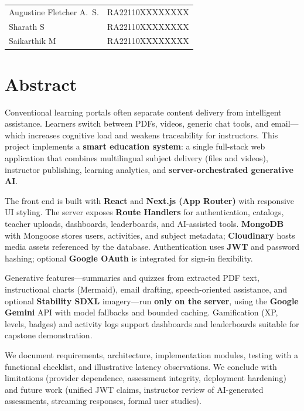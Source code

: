 \documentclass[a4paper,12pt,openany]{report}
\newcommand{\StudentOneName}{Augustine Fletcher A.\ S.}
\newcommand{\StudentOneReg}{RA22110XXXXXXXX}
\newcommand{\StudentTwoName}{Sharath S}
\newcommand{\StudentTwoReg}{RA22110XXXXXXXX}
\newcommand{\StudentThreeName}{Saikarthik M}
\newcommand{\StudentThreeReg}{RA22110XXXXXXXX}
\begin{document}
\vspace{1.5cm}
\noindent\begin{tabular}{ll}
\StudentOneName & \StudentOneReg \\[0.5em]
\StudentTwoName & \StudentTwoReg \\[0.5em]
\StudentThreeName & \StudentThreeReg \\
\end{tabular}

\clearpage

\chapter*{Abstract}
Conventional learning portals often separate content delivery from intelligent assistance. Learners switch between PDFs, videos, generic chat tools, and email---which increases cognitive load and weakens traceability for instructors. This project implements a \textbf{smart education system}: a single full-stack web application that combines multilingual subject delivery (files and videos), instructor publishing, learning analytics, and \textbf{server-orchestrated generative AI}.

The front end is built with \textbf{React} and \textbf{Next.js (App Router)} with responsive UI styling. The server exposes \textbf{Route Handlers} for authentication, catalogs, teacher uploads, dashboards, leaderboards, and AI-assisted tools. \textbf{MongoDB} with Mongoose stores users, activities, and subject metadata; \textbf{Cloudinary} hosts media assets referenced by the database. Authentication uses \textbf{JWT} and password hashing; optional \textbf{Google OAuth} is integrated for sign-in flexibility.

Generative features---summaries and quizzes from extracted PDF text, instructional charts (Mermaid), email drafting, speech-oriented assistance, and optional \textbf{Stability SDXL} imagery---run \textbf{only on the server}, using the \textbf{Google Gemini} API with model fallbacks and bounded caching. Gamification (XP, levels, badges) and activity logs support dashboards and leaderboards suitable for capstone demonstration.

We document requirements, architecture, implementation modules, testing with a functional checklist, and illustrative latency observations. We conclude with limitations (provider dependence, assessment integrity, deployment hardening) and future work (unified JWT claims, instructor review of AI-generated assessments, streaming responses, formal user studies).
\end{document}
